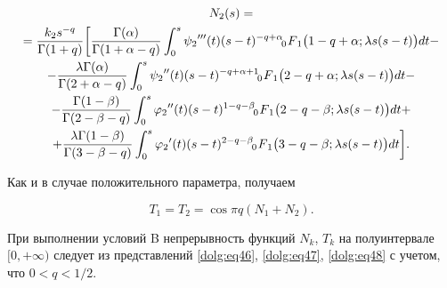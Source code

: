 \begin{multline}

N_2(s) =

\\

= \frac{k_2 s^{-q}}{\Gamma(1+q)} \biggl[\frac{\Gamma(\alpha)}{\Gamma(1+\alpha-q)} \int _0^s {\psi_2}'''(t) (s-t)^{-q+\alpha}  \,\,

F_{\hspace{-4mm}0 \hspace{3mm}1} \bigl(1-q+\alpha;\lambda s (s-t)\bigr) dt - 

\\

- \frac{\lambda\Gamma(\alpha)}{\Gamma(2+\alpha-q)} \int _0^s {\psi_2}''(t) (s-t)^{-q+\alpha+1}  \,\,

F_{\hspace{-4mm}0 \hspace{3mm}1} \bigl(2-q+\alpha;\lambda s (s-t)\bigr) dt - 

\\

 - \frac{\Gamma(1-\beta)}{\Gamma(2-\beta-q)} \int _0^s {\varphi_2}''(t) (s-t)^{1-q-\beta}  \,\,

F_{\hspace{-4mm}0 \hspace{3mm}1} \bigl(2-q-\beta;\lambda s (s-t)\bigr) dt + 

\\

\label{dolg:eq47}

+ \frac{\lambda \Gamma(1-\beta)}{\Gamma(3-\beta-q)} \int _0^s {\varphi_2}'(t) (s-t)^{2-q-\beta}  \,\,

F_{\hspace{-4mm}0 \hspace{3mm}1} \bigl(3-q-\beta;\lambda s (s-t)\bigr) dt\biggr].

\end{multline}



Как и в случае положительного параметра, получаем

\begin{equation}\label{dolg:eq48}

T_1 = T_2 = \cos\pi q (N_1+N_2).

\end{equation}



При выполнении условий B непрерывность функций $N_k$, $T_k$ на полуинтервале $[0,+\infty)$ следует из представлений \eqref{dolg:eq46}, \eqref{dolg:eq47}, \eqref{dolg:eq48} с учетом, что \mbox{$0{<}q{<}{1}/{2}$.} 

